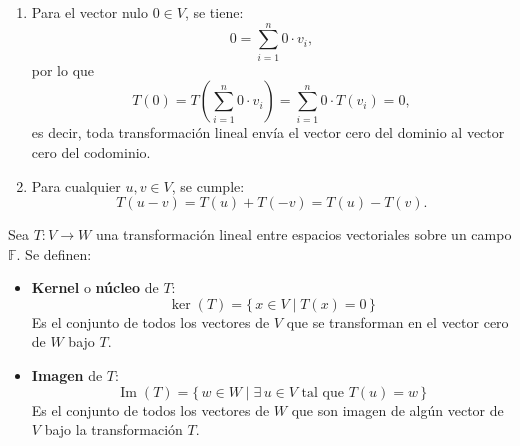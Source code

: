 \begin{example}
\begin{enumerate}
    \item Para el vector nulo $0 \in V$, se tiene:
    \[
    0 = \sum_{i=1}^n 0 \cdot v_i,
    \]
    por lo que
    \[
    T(0) = T\left(\sum_{i=1}^n 0 \cdot v_i\right) = \sum_{i=1}^n 0 \cdot T(v_i) = 0,
    \]
    es decir, toda transformación lineal envía el vector cero del dominio al vector cero del codominio.

    \item Para cualquier $u, v \in V$, se cumple:
    \[
    T(u - v) = T(u) + T(-v) = T(u) - T(v).
    \]
\end{enumerate}
\end{example}

\begin{definition}
Sea $T: V \to W$ una transformación lineal entre espacios vectoriales sobre un campo $\mathbb{F}$. Se definen:

\begin{itemize}
    \item \textbf{Kernel} o \textbf{núcleo} de $T$:
    \[
    \ker(T) = \{\, x \in V \mid T(x) = 0 \,\}
    \]
    Es el conjunto de todos los vectores de $V$ que se transforman en el vector cero de $W$ bajo $T$.

    \item \textbf{Imagen} de $T$:
    \[
    \operatorname{Im}(T) = \{\, w \in W \mid \exists\, u \in V \text{ tal que } T(u) = w \,\}
    \]
    Es el conjunto de todos los vectores de $W$ que son imagen de algún vector de $V$ bajo la transformación $T$.
\end{itemize}
\end{definition}



